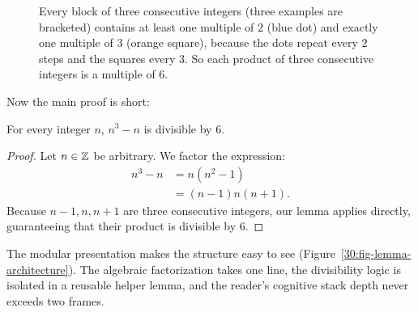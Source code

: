 \begin{example}
\begin{figure}[htbp]
\centering
{}
\caption{Every block of three consecutive integers (three examples are bracketed) contains at least one multiple of $2$ (blue dot) and exactly one multiple of $3$ (orange square), because the dots repeat every $2$ steps and the squares every $3$. So each product of three consecutive integers is a multiple of $6$.}
\label{30:fig-consecutive}
\end{figure}

Now the main proof is short:

\begin{theorem}
For every integer $n$, $n^3 - n$ is divisible by $6$.
\end{theorem}
\begin{proof}
Let $n \in \mathbb{Z}$ be arbitrary. We factor the expression:
\begin{align*}
n^3 - n &= n(n^2 - 1) \\
        &= (n-1)n(n+1).
\end{align*}
Because $n-1, n, n+1$ are three consecutive integers, our lemma applies directly, guaranteeing that their product is divisible by $6$.
\end{proof}

The modular presentation makes the structure easy to see (Figure~\ref{30:fig-lemma-architecture}). The algebraic factorization takes one line, the divisibility logic is isolated in a reusable helper lemma, and the reader's cognitive stack depth never exceeds two frames.
\end{example}


